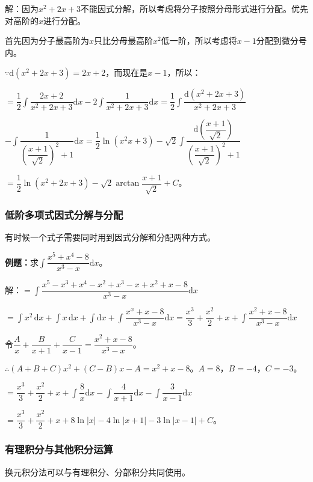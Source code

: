 \documentclass[UTF8, 12pt]{ctexart}
\begin{document}
解：因为$x^2+2x+3$不能因式分解，所以考虑将分子按照分母形式进行分配。优先对高阶的$x$进行分配。

首先因为分子最高阶为$x$只比分母最高阶$x^2$低一阶，所以考虑将$x-1$分配到微分号内。

$\because\textrm{d}(x^2+2x+3)=2x+2$，而现在是$x-1$，所以：

$=\displaystyle{\dfrac{1}{2}\int\dfrac{2x+2}{x^2+2x+3}\textrm{d}x-2\int\dfrac{1}{x^2+2x+3}\textrm{d}x}=\displaystyle{\dfrac{1}{2}\int\dfrac{\textrm{d}(x^2+2x+3)}{x^2+2x+3}}$

$-\displaystyle{\int\dfrac{1}{\left(\dfrac{x+1}{\sqrt{2}}\right)^2+1}\textrm{d}x}=\displaystyle{\dfrac{1}{2}\ln(x^2x+3)-\sqrt{2}\int\dfrac{\textrm{d}\left(\dfrac{x+1}{\sqrt{2}}\right)}{\left(\dfrac{x+1}{\sqrt{2}}\right)^2+1}}$

$=\dfrac{1}{2}\ln(x^2+2x+3)-\sqrt{2}\arctan\dfrac{x+1}{\sqrt{2}}+C$。

\subsubsection{低阶多项式因式分解与分配}

有时候一个式子需要同时用到因式分解和分配两种方式。

\textbf{例题：}求$\displaystyle{\int\dfrac{x^5+x^4-8}{x^3-x}\textrm{d}x}$。

解：$=\displaystyle{\int\dfrac{x^5-x^3+x^4-x^2+x^3-x+x^2+x-8}{x^3-x}\textrm{d}x}$

$=\int x^2\,\textrm{d}x+\int x\,\textrm{d}x+\int\textrm{d}x+\displaystyle{\int\dfrac{x^x+x-8}{x^3-x}\textrm{d}x}=\dfrac{x^3}{3}+\dfrac{x^2}{2}+x+\displaystyle{\int\dfrac{x^2+x-8}{x^3-x}\textrm{d}x}$

令$\dfrac{A}{x}+\dfrac{B}{x+1}+\dfrac{C}{x-1}=\dfrac{x^2+x-8}{x^3-x}$。

$\therefore(A+B+C)x^2+(C-B)x-A=x^2+x-8$。$A=8$，$B=-4$，$C=-3$。

$=\dfrac{x^3}{3}+\dfrac{x^2}{2}+x+\displaystyle{\int\dfrac{8}{x}\textrm{d}x-\int\dfrac{4}{x+1}\textrm{d}x-\int\dfrac{3}{x-1}\textrm{d}x}$

$=\dfrac{x^3}{3}+\dfrac{x^2}{2}+x+8\ln\vert x\vert-4\ln\vert x+1\vert-3\ln\vert x-1\vert+C$。

\subsubsection{有理积分与其他积分运算}

换元积分法可以与有理积分、分部积分共同使用。
\end{document}
